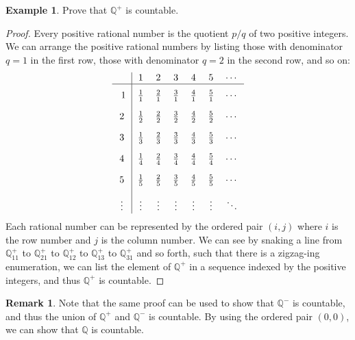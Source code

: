 \documentclass[article, 11pt]{article}
\theoremstyle{definition}
\newtheorem{example}{Example}
\newtheorem*{remark}{Remark}
\newcommand{\rats}{\mathbb{Q}}
\begin{document}
    \begin{example}
        Prove that $\rats^+$ is countable.
        \begin{proof}
            Every positive rational number is the quotient $p/q$ of two positive integers. We can arrange the positive rational numbers by listing those with denominator $q=1$ in the first row, those with denominator $q=2$ in the second row, and so on:
            \begin{align*}
                \begin{tabular}{c | c c c c c c}
                      & 1           & 2           & 3           & 4           & 5           & $\cdots$ \\
                      \hline\rule{0pt}{1.2\normalbaselineskip} 
                    1 & $\frac{1}{1}$ & $\frac{2}{1}$ & $\frac{3}{1}$ & $\frac{4}{1}$ & $\frac{5}{1}$ & $\cdots$ \\[1em]
                    2 & $\frac{1}{2}$ & $\frac{2}{2}$ & $\frac{3}{2}$ & $\frac{4}{2}$ & $\frac{5}{2}$ & $\cdots$ \\[1em]
                    3 & $\frac{1}{3}$ & $\frac{2}{3}$ & $\frac{3}{3}$ & $\frac{4}{3}$ & $\frac{5}{3}$ & $\cdots$ \\[1em]
                    4 & $\frac{1}{4}$ & $\frac{2}{4}$ & $\frac{3}{4}$ & $\frac{4}{4}$ & $\frac{5}{4}$ & $\cdots$ \\[1em]
                    5 & $\frac{1}{5}$ & $\frac{2}{5}$ & $\frac{3}{5}$ & $\frac{4}{5}$ & $\frac{5}{5}$ & $\cdots$ \\[1em]
                    $\vdots$ & $\vdots$ & $\vdots$ & $\vdots$ & $\vdots$ & $\vdots$ & $\ddots$
                \end{tabular}    
            \end{align*}
            Each rational number can be represented by the ordered pair $(i,j)$ where $i$ is the row number and $j$ is the column number. We can see by snaking a line from $\rats^{+}_{11}$ to $\rats^{+}_{21}$ to $\rats^{+}_{12}$ to $\rats^{+}_{13}$ to $\rats^{+}_{31}$ and so forth, such that there is a zigzag-ing enumeration, we can list the element of $\rats^+$ in a sequence indexed by the positive integers, and thus $\rats^+$ is countable.
        \end{proof}
    \end{example}
    \begin{remark}
        Note that the same proof can be used to show that $\rats^-$ is countable, and thus the union of $\rats^+$ and $\rats^-$ is countable. By using the ordered pair $(0,0)$, we can show that $\rats$ is countable.
    \end{remark}
\end{document}
